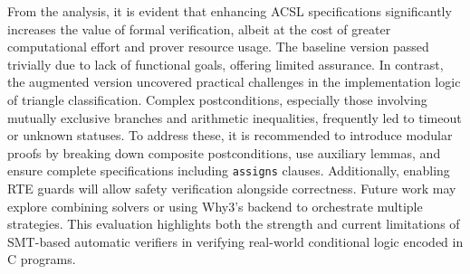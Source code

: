 \documentclass[12pt]{article}
\begin{document}
From the analysis, it is evident that enhancing ACSL specifications significantly increases the value of formal verification, albeit at the cost of greater computational effort and prover resource usage. The baseline version passed trivially due to lack of functional goals, offering limited assurance. In contrast, the augmented version uncovered practical challenges in the implementation logic of triangle classification. Complex postconditions, especially those involving mutually exclusive branches and arithmetic inequalities, frequently led to timeout or unknown statuses. To address these, it is recommended to introduce modular proofs by breaking down composite postconditions, use auxiliary lemmas, and ensure complete specifications including \texttt{assigns} clauses. Additionally, enabling RTE guards will allow safety verification alongside correctness. Future work may explore combining solvers or using Why3’s backend to orchestrate multiple strategies. This evaluation highlights both the strength and current limitations of SMT-based automatic verifiers in verifying real-world conditional logic encoded in C programs.
\end{document}
